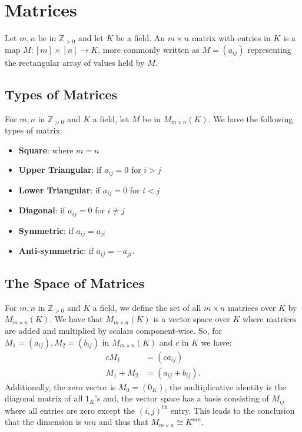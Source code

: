 \section{Matrices}

Let $m, n$ be in $\mathbb{Z}_{>0}$ and let $K$ be a field. An
$m \times n$ matrix with entries in $K$ is a map
$M : [m] \times [n] \to K$, more commonly written as 
$M = (a_{ij})$ representing the rectangular array of values held
by $M$.

\subsection{Types of Matrices}

For $m, n$ in $\mathbb{Z}_{>0}$ and $K$ a field, let $M$
be in $M_{m \times n}(K)$. We have the following types of
matrix: \begin{itemize}
  \item \textbf{Square}: where $m = n$
  \item \textbf{Upper Triangular}: if $a_{ij} = 0$ for $i > j$
  \item \textbf{Lower Triangular}: if $a_{ij} = 0$ for $i < j$
  \item \textbf{Diagonal}: if $a_{ij} = 0$ for $i \neq j$
  \item \textbf{Symmetric}: if $a_{ij} = a_{ji}$
  \item \textbf{Anti-symmetric}: if $a_{ij} = -a_{ji}$.
\end{itemize}

\subsection{The Space of Matrices}

For $m, n$ in $\mathbb{Z}_{>0}$ and $K$ a field, we define
the set of all $m \times n$ matrices over $K$ by $M_{m \times n}(K)$.
We have that $M_{m \times n}(K)$ is a vector space over $K$
where matrices are added and multiplied by scalars component-wise.
So, for $M_1 = (a_{ij}), M_2 = (b_{ij})$ in $M_{m\times n}(K)$
and $c$ in $K$ we have:
\begin{align*}
  cM_1 &= (ca_{ij}) \\
  M_1 + M_2 &= (a_{ij} + b_{ij}).
\end{align*} Additionally, the zero vector is $M_0 = (0_K)$, the 
multiplicative identity is the diagonal matrix of all $1_K$'s and, the vector
space has a basis consisting of $M_{ij}$ where all entries are zero
except the $(i, j)^{\text{th}}$ entry. This leads to the conclusion
that the dimension is $mn$ and thus that $M_{m \times n} \cong K^{mn}$.

